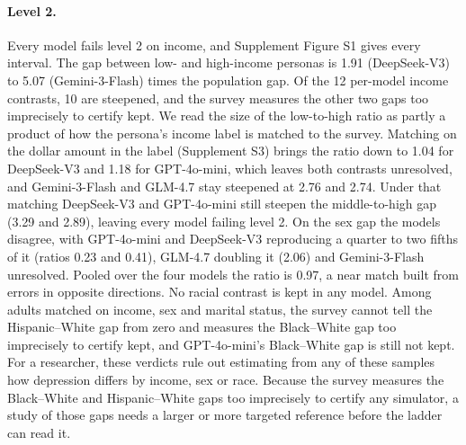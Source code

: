 \paragraph{Level 2.}
Every model fails level 2 on income, and Supplement Figure S1 gives every interval.
The gap between low- and high-income personas is 1.91 (DeepSeek-V3) to 5.07 (Gemini-3-Flash) times the population gap. %
Of the 12 per-model income contrasts, 10 are steepened, and the survey measures the other two gaps too imprecisely to certify kept. %
We read the size of the low-to-high ratio as partly a product of how the persona's income label is matched to the survey. %
Matching on the dollar amount in the label (Supplement S3) brings the ratio down to 1.04 for DeepSeek-V3 and 1.18 for GPT-4o-mini, which leaves both contrasts unresolved, and Gemini-3-Flash and GLM-4.7 stay steepened at 2.76 and 2.74. %
Under that matching DeepSeek-V3 and GPT-4o-mini still steepen the middle-to-high gap (3.29 and 2.89), leaving every model failing level 2. %
On the sex gap the models disagree, with GPT-4o-mini and DeepSeek-V3 reproducing a quarter to two fifths of it (ratios 0.23 and 0.41), GLM-4.7 doubling it (2.06) and Gemini-3-Flash unresolved. %
Pooled over the four models the ratio is 0.97, a near match built from errors in opposite directions. %
No racial contrast is kept in any model.
Among adults matched on income, sex and marital status, the survey cannot tell the Hispanic--White gap from zero and measures the Black--White gap too imprecisely to certify kept, and GPT-4o-mini's Black--White gap is still not kept. %
For a researcher, these verdicts rule out estimating from any of these samples how depression differs by income, sex or race.
Because the survey measures the Black--White and Hispanic--White gaps too imprecisely to certify any simulator, a study of those gaps needs a larger or more targeted reference before the ladder can read it.

